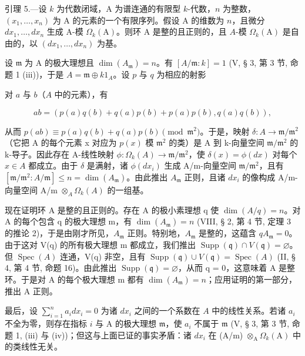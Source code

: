 引理 5.—设 \(k\) 为代数闭域，A 为谱连通的有限型 \(k\)-代数，\(n\) 为整数，\((x_{1},\ldots,x_{n})\) 为 A 的元素的一个有限序列。假设 A 的维数为 \(n\)，且微分 \(dx_{1},\ldots,dx_{n}\) 生成 A-模 \(\Omega_{k}(\mathrm{A})\)。则环 A 是整的且正则的，且 \(A\)-模 \(\Omega_{k}(\mathrm{A})\) 是自由的，以 \((dx_{1},\ldots,dx_{n})\) 为基。

设 \(\mathfrak{m}\) 为 A 的极大理想且 \(\dim(A_{\mathfrak{m}})=n\)。有 \([A/\mathfrak{m}:k]=1\) (V, § 3, 第 3 节, 命题 1 (iii))，于是 \(A=\mathfrak{m}\oplus k1_{A}\)。设 \(p\) 与 \(q\) 为相应的射影

对 \(a\) 与 \(b\)（\(A\) 中的元素），有

\[
a b = \left(p (a) q (b) + q (a) p (b) + p (a) p (b), q (a) q (b)\right),
\]

从而 \(p(ab) \equiv p(a)q(b) + q(a)p(b) \pmod{\mathfrak{m}^{2}}\)。于是，映射 \(\delta: A \to \mathfrak{m}/\mathfrak{m}^{2}\)（它把 A 的每个元素 x 对应为 \(p(x)\) 模 \(\mathfrak{m}^{2}\) 的类）是 A 到 k-向量空间 \(\mathfrak{m}/\mathfrak{m}^{2}\) 的 k-导子。因此存在 A-线性映射 \(\phi: \Omega_{k}(A) \to \mathfrak{m}/\mathfrak{m}^{2}\)，使 \(\delta(x) = \phi(dx)\) 对每个 \(x \in A\) 都成立。由于 \(\delta\) 是满射，诸 \(\phi(dx_{i})\) 生成 A/m-向量空间 \(\mathfrak{m}/\mathfrak{m}^{2}\)，且有 \([\mathfrak{m}/\mathfrak{m}^{2}: A/\mathfrak{m}] \leqslant n = \dim(A_{\mathfrak{m}})\)。由此推出 \(A_{\mathfrak{m}}\) 正则，且诸 \(dx_{i}\) 的像构成 A/m-向量空间 A/m \(\otimes_{A} \Omega_{k}(A)\) 的一组基。

现在证明环 A 是整的且正则的。存在 A 的极小素理想 q 使 \(\dim(A/q) = n\)。对 A 的每个包含 q 的极大理想 m，有 \(\dim(A_{\mathfrak{m}}) = n\) (VIII, § 2, 第 4 节, 定理 3 的推论 2)，于是由刚才所见，\(A_{\mathfrak{m}}\) 正则。特别地，\(A_{\mathfrak{m}}\) 是整的，这蕴含 \(qA_{\mathfrak{m}} = 0\)。由于这对 V(q) 的所有极大理想 m 都成立，我们推出 \(\operatorname{Supp}(\mathfrak{q}) \cap V(\mathfrak{q}) = \varnothing\)。但 \(\operatorname{Spec}(A)\) 连通，V(q) 非空，且有 \(\operatorname{Supp}(\mathfrak{q}) \cup V(\mathfrak{q}) = \operatorname{Spec}(A)\) (II, § 4, 第 4 节, 命题 16)。由此推出 \(\operatorname{Supp}(\mathfrak{q}) = \varnothing\)，从而 q = 0，这意味着 A 是整环。于是对 A 的每个极大理想 m 都有 \(\dim(A_{\mathfrak{m}}) = n\)；应用证明的第一部分，推出 A 正则。

最后，设 \(\sum_{i=1}^{n} a_i dx_i = 0\) 为诸 \(dx_i\) 之间的一个系数在 \(A\) 中的线性关系。若诸 \(a_i\) 不全为零，则存在指标 \(i\) 与 A 的极大理想 \(\mathfrak{m}\)，使 \(a_i\) 不属于 \(\mathfrak{m}\) (V, § 3, 第 3 节, 命题 1, (iii) 与 (iv))；但这与上面已证的事实矛盾：诸 \(dx_i\) 在 (A/m) \(\otimes_{\mathrm{A}} \Omega_k(\mathrm{A})\) 中的类线性无关。

